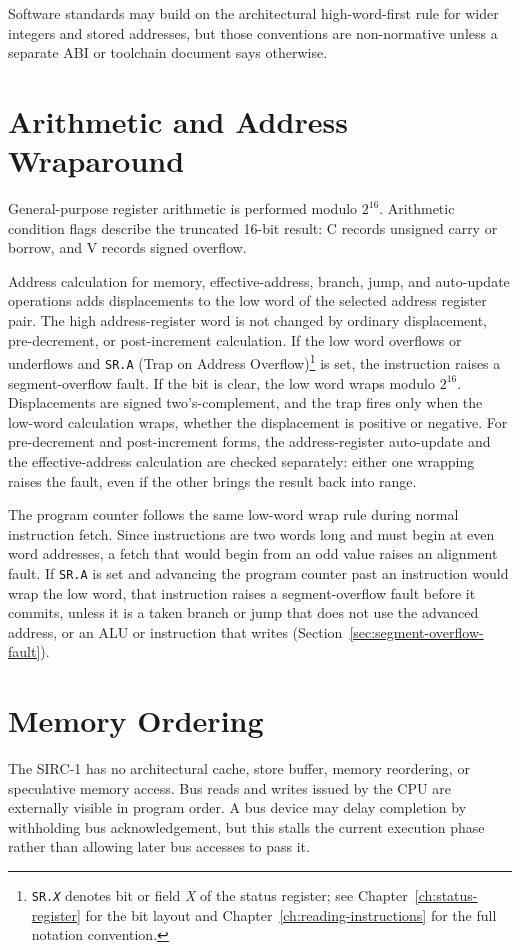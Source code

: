 Software standards may build on the architectural high-word-first rule for wider integers and stored addresses, but
those conventions are non-normative unless a separate ABI or toolchain document says otherwise.

\section{Arithmetic and Address Wraparound}
\label{sec:arithmetic-and-address-wraparound}

General-purpose register arithmetic is performed modulo $2^{16}$. Arithmetic condition flags describe the truncated
16-bit result: C records unsigned carry or borrow, and V records signed overflow.

Address calculation for memory, effective-address, branch, jump, and auto-update operations adds displacements to the
low word of the selected address register pair. The high address-register word is not changed by ordinary displacement,
pre-decrement, or post-increment calculation. If the low word overflows or underflows and \texttt{SR.A} (Trap on
Address Overflow)\footnote{\texttt{SR.\textit{X}} denotes bit or field \textit{X} of the status register; see
	Chapter~\ref{ch:status-register} for the bit layout and Chapter~\ref{ch:reading-instructions} for the full notation
	convention.} is set, the instruction raises a segment-overflow fault. If the bit is clear, the low word wraps modulo
$2^{16}$. Displacements are signed two's-complement, and the trap fires only when the low-word calculation wraps,
whether the displacement is positive or negative. For pre-decrement and post-increment forms, the address-register
auto-update and the effective-address calculation are checked separately: either one wrapping raises the fault, even if
the other brings the result back into range.

The program counter follows the same low-word wrap rule during normal instruction fetch. Since instructions are two
words long and must begin at even word addresses, a fetch that would begin from an odd  value raises an
alignment fault. If \texttt{SR.A} is set and advancing the program counter past an instruction would wrap the low word,
that instruction raises a segment-overflow fault before it commits, unless it is a taken branch or jump that does not
use the advanced address, or an ALU or  instruction that writes 
(Section~\ref{sec:segment-overflow-fault}).

\section{Memory Ordering}

The SIRC-1 has no architectural cache, store buffer, memory reordering, or speculative memory access. Bus reads and
writes issued by the CPU are externally visible in program order. A bus device may delay completion by withholding bus
acknowledgement, but this stalls the current execution phase rather than allowing later bus accesses to pass it.
